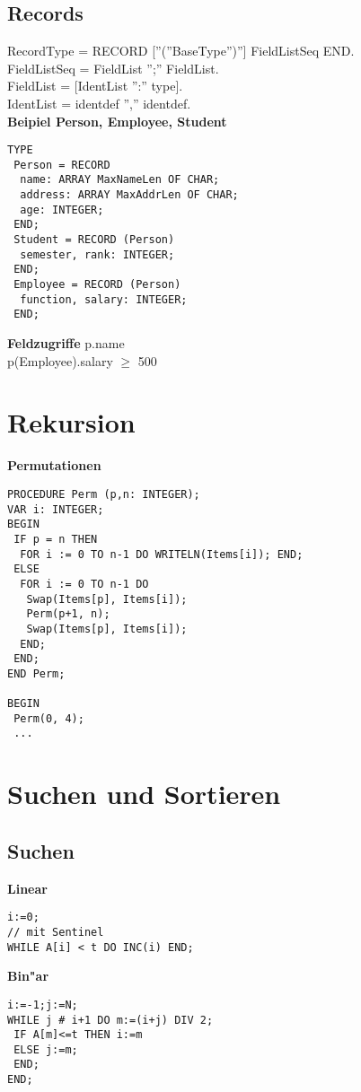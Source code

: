 \documentclass[10pt, a4paper, twocolumn]{scrartcl}
\begin{document}
\subsection{Records}

RecordType = RECORD [''(''BaseType'')''] FieldListSeq END.\\
FieldListSeq = FieldList {'';'' FieldList}.\\
FieldList = [IdentList '':'' type].\\
IdentList = identdef {'','' identdef}.\\

{\bf Beipiel Person, Employee, Student}
\begin{verbatim}
TYPE
 Person = RECORD
  name: ARRAY MaxNameLen OF CHAR;
  address: ARRAY MaxAddrLen OF CHAR;
  age: INTEGER;
 END;
 Student = RECORD (Person)
  semester, rank: INTEGER;
 END;
 Employee = RECORD (Person)
  function, salary: INTEGER;
 END;
\end{verbatim}

{\bf Feldzugriffe}
p.name\\
p(Employee).salary $\geq$ 500


\section{Rekursion}

{\bf Permutationen}
\begin{verbatim}
PROCEDURE Perm (p,n: INTEGER);
VAR i: INTEGER;
BEGIN
 IF p = n THEN
  FOR i := 0 TO n-1 DO WRITELN(Items[i]); END;
 ELSE
  FOR i := 0 TO n-1 DO
   Swap(Items[p], Items[i]);
   Perm(p+1, n);
   Swap(Items[p], Items[i]);
  END;
 END;
END Perm;

BEGIN
 Perm(0, 4);
 ...
\end{verbatim}

\section{Suchen und Sortieren}

\subsection{Suchen}

{\bf Linear}
\begin{verbatim}
i:=0;
// mit Sentinel
WHILE A[i] < t DO INC(i) END;
\end{verbatim}

{\bf Bin"ar}
\begin{verbatim}
i:=-1;j:=N;
WHILE j # i+1 DO m:=(i+j) DIV 2;
 IF A[m]<=t THEN i:=m
 ELSE j:=m;
 END;
END;
\end{verbatim}
\end{document}
